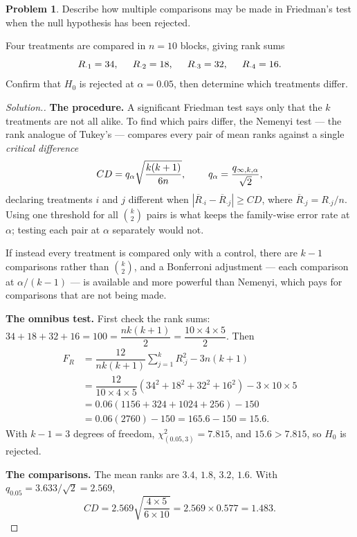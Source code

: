 \documentclass[11pt,a4paper]{article}
\theoremstyle{definition}
\newtheorem{problemx}{Problem}[section]
\newenvironment{problem}{\begin{problemx}}{\end{problemx}}
\newenvironment{solution}
  {\renewcommand{\qedsymbol}{}\begin{proof}[\textit{Solution}.]}
  {\end{proof}}
\begin{document}
\begin{problem}
Describe how multiple comparisons may be made in Friedman's test when the null
hypothesis has been rejected.

Four treatments are compared in $n=10$ blocks, giving rank sums
$$R_{\cdot 1}=34,\hspace{0.5cm}R_{\cdot 2}=18,\hspace{0.5cm}
R_{\cdot 3}=32,\hspace{0.5cm}R_{\cdot 4}=16 .$$
Confirm that $H_0$ is rejected at $\alpha=0.05$, then determine which treatments
differ.
\end{problem}

\begin{solution}
\textbf{The procedure.} A significant Friedman test says only that the $k$
treatments are not all alike. To find which pairs differ, the Nemenyi test --- the
rank analogue of Tukey's --- compares every pair of mean ranks against a single
\emph{critical difference}
$$CD=q_{\alpha}\sqrt{\dfrac{k(k+1)}{6n}},
\hspace{0.8cm}q_{\alpha}=\dfrac{q_{\infty,k,\alpha}}{\sqrt{2}},$$
declaring treatments $i$ and $j$ different when
$\left|\overline{R}_{\cdot i}-\overline{R}_{\cdot j}\right|\geq CD$, where
$\overline{R}_{\cdot j}=R_{\cdot j}/n$. Using one threshold for all
$\binom{k}{2}$ pairs is what keeps the family-wise error rate at $\alpha$; testing
each pair at $\alpha$ separately would not.

If instead every treatment is compared only with a control, there are $k-1$
comparisons rather than $\binom{k}{2}$, and a Bonferroni adjustment --- each
comparison at $\alpha/(k-1)$ --- is available and more powerful than Nemenyi,
which pays for comparisons that are not being made.

\textbf{The omnibus test.} First check the rank sums:
$34+18+32+16=100=\dfrac{nk(k+1)}{2}=\dfrac{10\times 4\times 5}{2}$. Then
\begin{align*}
F_R &=\dfrac{12}{nk(k+1)}\sum^{k}_{j=1}R_{\cdot j}^{2}-3n(k+1)\\
    &=\dfrac{12}{10\times 4\times 5}\left(34^{2}+18^{2}+32^{2}+16^{2}\right)
       -3\times 10\times 5\\
    &=0.06\left(1156+324+1024+256\right)-150\\
    &=0.06(2760)-150=165.6-150=15.6 .
\end{align*}
With $k-1=3$ degrees of freedom, $\chi^{2}_{(0.05,3)}=7.815$, and $15.6>7.815$, so
$H_0$ is rejected.

\textbf{The comparisons.} The mean ranks are $3.4$, $1.8$, $3.2$, $1.6$. With
$q_{0.05}=3.633/\sqrt{2}=2.569$,
$$CD=2.569\sqrt{\dfrac{4\times 5}{6\times 10}}=2.569\times 0.577=1.483 .$$


\end{solution}
\end{document}
